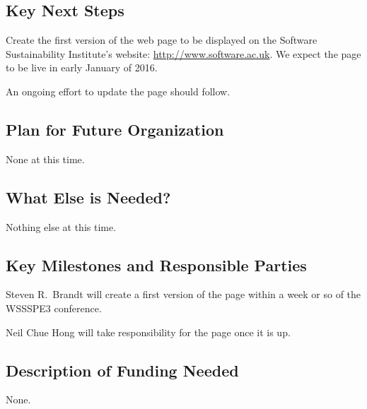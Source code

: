 \subsection{Key Next Steps}

Create the first version of the web page to be displayed on the Software
Sustainability Institute's website: \url{http://www.software.ac.uk}.
We expect the page to be live in early January of 2016.

An ongoing effort to update the page should follow.

\subsection{Plan for Future Organization}

None at this time.

\subsection{What Else is Needed?}

Nothing else at this time.

\subsection{Key Milestones and Responsible Parties}

Steven R.\ Brandt will create a first version of the page within a week or so of
the WSSSPE3 conference.

Neil Chue Hong will take responsibility for the page once it is up.

\subsection{Description of Funding Needed}

None.
